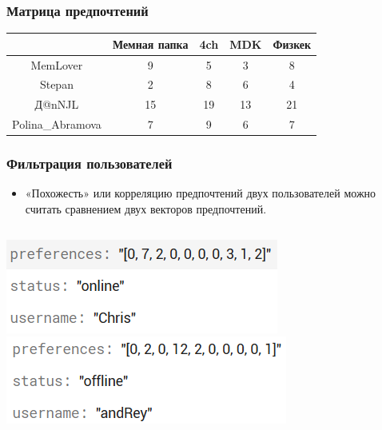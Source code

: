 \documentclass[xetex,mathserif,serif, xcolor=table]{beamer}
\begin{document}
	\begin{frame}
	    \frametitle{Матрица предпочтений}
        \begin{table}[]
            \begin{tabular}{|c|c|c|c|c|}
                \hline
                \multicolumn{1}{|l|}{}                   & \cellcolor[HTML]{CBCEFB}Мемная папка & \cellcolor[HTML]{CBCEFB}4ch & \cellcolor[HTML]{CBCEFB}MDK & \cellcolor[HTML]{CBCEFB}Физкек \\ \hline
                \cellcolor[HTML]{CBCEFB}MemLover         & 9                                    & 5                           & 3                           & 8                              \\ \hline
                \cellcolor[HTML]{CBCEFB}Stepan           & 2                                    & 8                           & 6                           & 4                              \\ \hline
                \cellcolor[HTML]{CBCEFB}Д@nNJL           & 15                                   & 19                          & 13                          & 21                             \\ \hline
                \cellcolor[HTML]{CBCEFB}Polina\_Abramova & 7                                    & 9                           & 6                           & 7                              \\ \hline
            \end{tabular}
        \end{table}        
    \end{frame}		
	
	
	\begin{frame}
    	\frametitle{Фильтрация пользователей}
    	     \begin{itemize}
	            \item «Похожесть» или корреляцию предпочтений двух пользователей можно считать сравнением двух векторов предпочтений.
	         \end{itemize}
    	     \begin{columns}[t]
                    \includegraphics[scale=0.7]{images/user.png}
                    \includegraphics[scale=0.7]{images/user2.png}
            \end{columns}
	\end{frame}	
\end{document}
